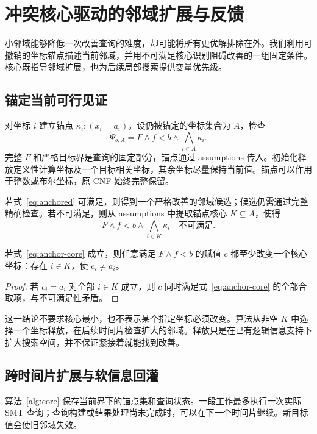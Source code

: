 \section{冲突核心驱动的邻域扩展与反馈}
\label{sec:core}

小邻域能够降低一次改善查询的难度，却可能将所有更优解排除在外。我们利用可撤销的坐标锚点描述当前邻域，并用不可满足核心识别阻碍改善的一组固定条件。核心既指导邻域扩展，也为后续局部搜索提供变量优先级。

\subsection{锚定当前可行见证}
对坐标 $i$ 建立锚点 $\kappa_i:(x_i=a_i)$。设仍被锚定的坐标集合为 $A$，检查
\begin{equation}
 \Psi_{b,A}=F\land f<b\land\bigwedge_{i\in A}\kappa_i.
 \label{eq:anchored}
\end{equation}
完整 $F$ 和严格目标界是查询的固定部分，锚点通过 assumptions 传入。初始化释放定义性计算坐标及一个目标相关坐标，其余坐标尽量保持当前值。锚点可以作用于整数或布尔坐标，原 CNF 始终完整保留。

若式~\eqref{eq:anchored} 可满足，则得到一个严格改善的邻域候选；候选仍需通过完整精确检查。若不可满足，则从 assumptions 中提取锚点核心 $K\subseteq A$，使得
\begin{equation}
 F\land f<b\land\bigwedge_{i\in K}\kappa_i\quad\text{不可满足}.
 \label{eq:anchor-core}
\end{equation}

\begin{proposition}[核心指导的释放]
\label{prop:core}
若式~\eqref{eq:anchor-core} 成立，则任意满足 $F\land f<b$ 的赋值 $c$ 都至少改变一个核心坐标：存在 $i\in K$，使 $c_i\ne a_i$。
\end{proposition}
\begin{proof}
若 $c_i=a_i$ 对全部 $i\in K$ 成立，则 $c$ 同时满足式~\eqref{eq:anchor-core} 的全部合取项，与不可满足性矛盾。
\end{proof}

这一结论不要求核心最小，也不表示某个指定坐标必须改变。算法从非空 $K$ 中选择一个坐标释放，在后续时间片检查扩大的邻域。释放只是在已有逻辑信息支持下扩大搜索空间，并不保证紧接着就能找到改善。

\subsection{跨时间片扩展与软信息回灌}
算法~\ref{alg:core} 保存当前界下的锚点集和查询状态。一段工作最多执行一次实际 SMT 查询；查询构建或结果处理尚未完成时，可以在下一个时间片继续。新目标值会使旧邻域失效。

